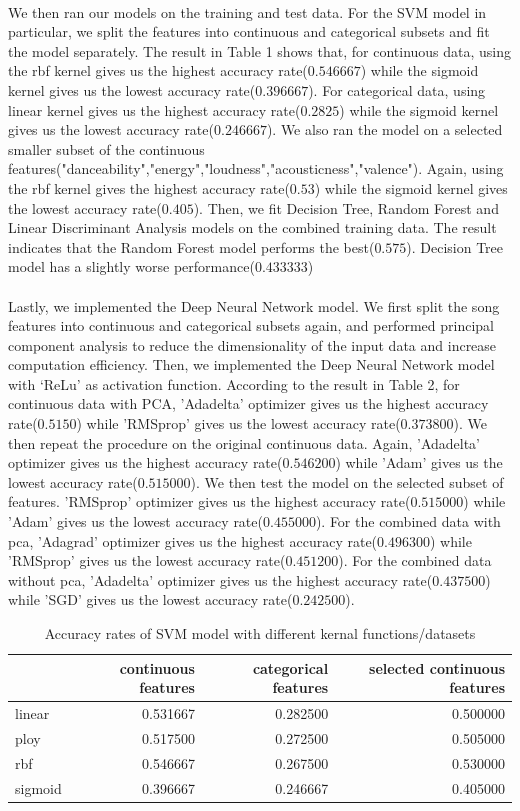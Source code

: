 \documentclass{article}
\begin{document}
\\
We then ran our models on the training and test data. For the SVM model in particular, we split the features into continuous and categorical subsets and fit the model separately. The result in Table 1 shows that, for continuous data, using the rbf kernel gives us the highest accuracy rate($0.546667$) while the sigmoid kernel gives us the lowest accuracy rate($0.396667$). For categorical data, using linear kernel gives us the highest accuracy rate($0.2825$) while the sigmoid kernel gives us the lowest accuracy rate($0.246667$). We also ran the model on a selected smaller subset of the continuous features("danceability","energy","loudness","acousticness","valence"). Again, using the rbf kernel gives the highest accuracy rate($0.53$) while the sigmoid kernel gives the lowest accuracy rate($0.405$). Then, we fit Decision Tree,  Random Forest and Linear Discriminant Analysis models on the combined training data. The result indicates that the Random Forest model performs the best($0.575$). Decision Tree model has a slightly worse performance($0.433333$)\\
\\
Lastly, we implemented the Deep Neural Network model. We first split the song features into continuous and categorical subsets again, and performed principal component analysis to reduce the dimensionality of the input data and increase computation efficiency. Then, we implemented the Deep Neural Network model with ‘ReLu’ as activation function. According to the result in Table 2, for continuous data with PCA, 'Adadelta' optimizer gives us the highest accuracy rate($0.5150$) while 'RMSprop' gives us the lowest accuracy rate($0.373800$). We then repeat the procedure on the original continuous data. Again, 'Adadelta' optimizer gives us the highest accuracy rate($0.546200$) while 'Adam' gives us the lowest accuracy rate($0.515000$). We then test the model on the selected subset of features. 'RMSprop' optimizer gives us the highest accuracy rate($0.515000$) while 'Adam' gives us the lowest accuracy rate($0.455000$). For the combined data with pca, 'Adagrad' optimizer gives us the highest accuracy rate($0.496300$) while 'RMSprop' gives us the lowest accuracy rate($0.451200$). For the combined data without pca,  'Adadelta' optimizer gives us the highest accuracy rate($0.437500$) while 'SGD' gives us the lowest accuracy rate($0.242500$).

\begin{table}
\caption{Accuracy rates of SVM model with different kernal functions/datasets}
\centering
\begin{tabular}{lrrr}
\hline
\toprule
 & continuous features & categorical features & selected continuous features \\
\midrule
\hline
linear & 0.531667 & 0.282500 & 0.500000 \\
ploy & 0.517500 & 0.272500 & 0.505000 \\
rbf & 0.546667 & 0.267500 & 0.530000 \\
sigmoid & 0.396667 & 0.246667 & 0.405000 \\
\bottomrule
\hline
\end{tabular}
\end{table}
\end{document}
